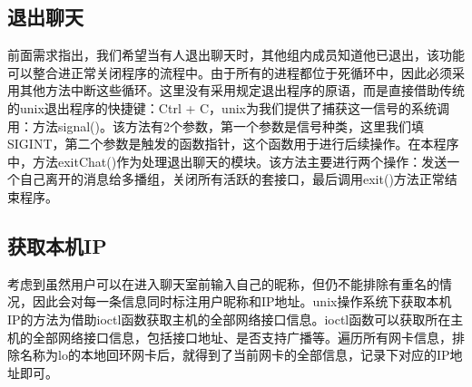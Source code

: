 \documentclass[UTF8]{ctexart}
\begin{document}
\subsection{退出聊天}
前面需求指出，我们希望当有人退出聊天时，其他组内成员知道他已退出，该功能可以整合进正常关闭程序的流程中。由于所有的进程都位于死循环中，因此必须采用其他方法中断这些循环。这里没有采用规定退出程序的原语，而是直接借助传统的unix退出程序的快捷键：Ctrl + C，unix为我们提供了捕获这一信号的系统调用：方法signal()。该方法有2个参数，第一个参数是信号种类，这里我们填SIGINT，第二个参数是触发的函数指针，这个函数用于进行后续操作。在本程序中，方法exitChat()作为处理退出聊天的模块。该方法主要进行两个操作：发送一个自己离开的消息给多播组，关闭所有活跃的套接口，最后调用exit()方法正常结束程序。
\subsection{获取本机IP}
考虑到虽然用户可以在进入聊天室前输入自己的昵称，但仍不能排除有重名的情况，因此会对每一条信息同时标注用户昵称和IP地址。unix操作系统下获取本机IP的方法为借助ioctl函数获取主机的全部网络接口信息。ioctl函数可以获取所在主机的全部网络接口信息，包括接口地址、是否支持广播等。遍历所有网卡信息，排除名称为lo的本地回环网卡后，就得到了当前网卡的全部信息，记录下对应的IP地址即可。
\end{document}
